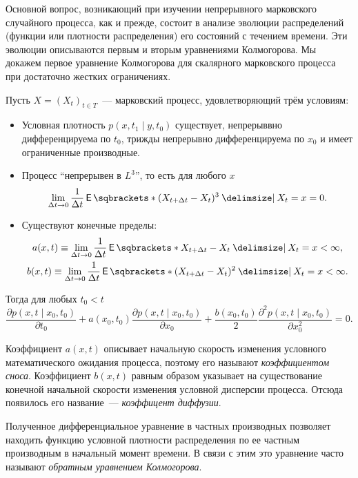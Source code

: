 Основной вопрос, возникающий при изучении непрерывного марковского случайного 
процесса, как и прежде, состоит в анализе эволюции распределений (функции или
плотности распределения) его состояний с течением времени. Эти эволюции 
описываются первым и вторым уравнениями Колмогорова. Мы докажем первое 
уравнение Колмогорова для скалярного марковского процесса при достаточно 
жестких ограничениях.
\begin{theorem}
	Пусть \(X = (X_{t})_{t \in T}\)~--- марковский процесс, удовлетворяющий 
	трём условиям:
	\begin{itemize}
		\item Условная плотность \(p(x, t_{1} \mid y, t_{0})\) существует,  
		непрерыввно дифференцируема по \(t_{0}\), трижды непрерывно 
		дифференцируема по \(x_{0}\) и имеет ограниченные производные.
		\item Процесс ``непрерывен в \(L^{3}\)'', то есть для любого \(x\)
		\[
			\lim\limits_{\Delta t \to 0} \frac{1}{\Delta t}\E{(X_{t + \Delta t} 
			- X_{t})^{3} \given X_{t} = x} = 0.
		\]
		\item Существуют конечные пределы:
		\begin{gather}
			a(x, t) \equiv \lim\limits_{\Delta t \to 0} \frac{1}{\Delta 
			t}\E{X_{t + \Delta t} - X_{t} \given X_{t} = x} < \infty, \\
			b(x, t) \equiv \lim\limits_{\Delta t \to 0} \frac{1}{\Delta 
			t}\E{(X_{t + \Delta t} - X_{t})^{2} \given X_{t} = x} < \infty.
		\end{gather}
	\end{itemize}

	Тогда для любых \(t_{0} < t\)
	\[
		\frac{\partial p(x, t \mid x_{0}, t_{0})}{\partial t_{0}} + a(x_{0}, 
		t_{0})\frac{\partial p(x, t \mid x_{0}, t_{0})}{\partial x_{0}} + 
		\frac{b(x_{0}, t_{0})}{2}\frac{\partial^{2} p(x, t \mid x_{0}, 
		t_{0})}{\partial x_{0}^{2}} = 0.
	\]
\end{theorem}
\begin{remark}
	Коэффициент \(a(x, t)\) описывает начальную скорость изменения условного 
	математического ожидания процесса, поэтому его называют \emph{коэффициентом 
	сноса}. Коэффициент \(b(x, t)\) равным образом указывает на существование 
	конечной начальной скорости изменения условной дисперсии процесса. Отсюда 
	появилось его название~--- \emph{коэффицент диффузии}. 
	
	Полученное дифференциальное уравнение в частных производных позволяет 
	находить функцию условной плотности распределения по ее частным производным 
	в начальный момент времени. В связи с этим это уравнение часто называют 
	\emph{обратным уравнением Колмогорова}.
\end{remark}
